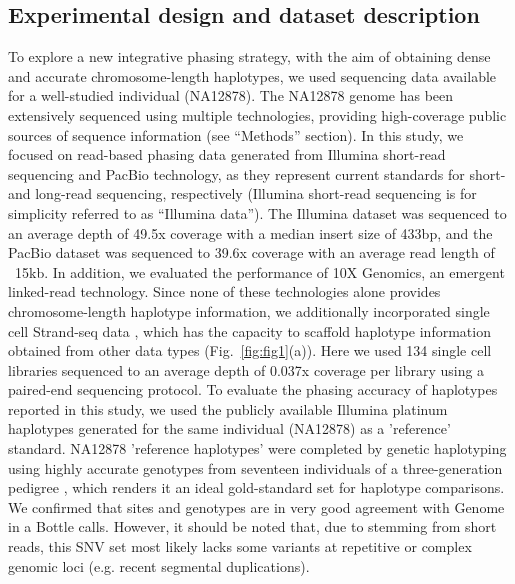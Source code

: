 \subsection{Experimental design and dataset description}
	To explore a new integrative phasing strategy, with the aim of obtaining dense and accurate chromosome-length haplotypes, we used sequencing data available for a well-studied individual (NA12878). 
	The NA12878 genome has been extensively sequenced using multiple technologies, providing high-coverage public sources of sequence information (see “Methods” section). 	
	In this study, we focused on read-based phasing data generated from Illumina short-read sequencing and PacBio technology, as they represent current standards for short- and long-read sequencing, 
	respectively (Illumina short-read sequencing is for simplicity referred to as “Illumina data”). 
	The Illumina dataset was sequenced to an average depth of 49.5x coverage with a median insert size of 433bp, and the PacBio dataset was sequenced to 39.6x coverage with an average read length of ~15kb.
	In addition, we evaluated the performance of 10X Genomics, an emergent linked-read technology. Since none of these technologies alone provides chromosome-length haplotype information, 
	we additionally incorporated single cell Strand-seq data \citep{porubsky2016direct}, which has the capacity to scaffold haplotype information obtained from other data types (Fig.~\ref{fig:fig1}(a)). 
	Here we used 134 single cell libraries sequenced to an average depth of 0.037x coverage per library using a paired-end sequencing protocol. 
	To evaluate the phasing accuracy of haplotypes reported in this study, we used the publicly available Illumina platinum haplotypes generated for the same individual (NA12878) as a 'reference' standard.
	NA12878 'reference haplotypes’ were completed by genetic haplotyping using highly accurate genotypes from seventeen individuals of a three-generation pedigree \citep{eberle2017reference}, which renders it an ideal gold-standard set for haplotype comparisons. 
	We confirmed that sites and genotypes are in very good agreement with Genome in a Bottle calls.
	However, it should be noted that, due to stemming from short reads, this SNV set most likely lacks some variants at repetitive or complex genomic loci (e.g. recent segmental duplications).

